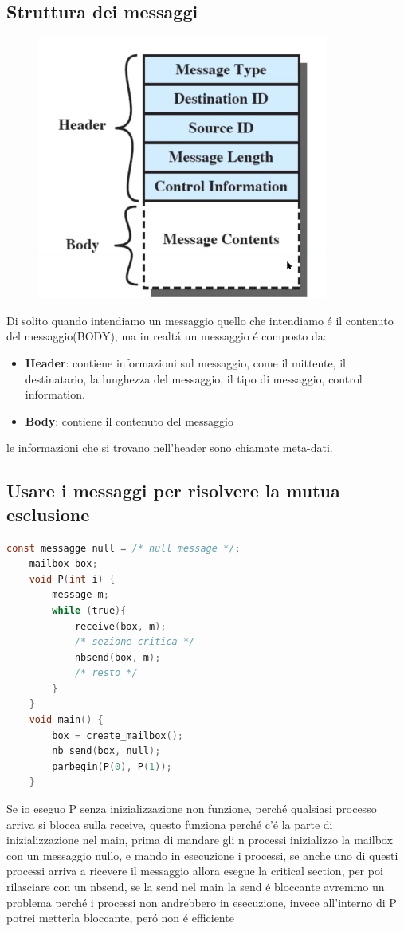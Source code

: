 \subsection{Struttura dei messaggi}
\begin{figure}[H]
    \centering
    \includegraphics[width=0.7\linewidth]{immagini/StrutturaDiUnMessaggio}
\end{figure}
Di solito quando intendiamo un messaggio quello che intendiamo é il contenuto del messaggio(BODY), ma in realtá un messaggio é composto da:
\begin{itemize}
    \item \textbf{Header}: contiene informazioni sul messaggio, come il mittente, il destinatario, la lunghezza del messaggio, il tipo di messaggio, control information.
    \item \textbf{Body}: contiene il contenuto del messaggio
\end{itemize}
le informazioni che si trovano nell'header sono chiamate meta-dati.
\subsection{Usare i messaggi per risolvere la mutua esclusione}
\begin{lstlisting}[language=C]
    const messagge null = /* null message */;
    mailbox box;
    void P(int i) {
        message m;
        while (true){
            receive(box, m);
            /* sezione critica */
            nbsend(box, m);
            /* resto */
        }
    }
    void main() {
        box = create_mailbox();
        nb_send(box, null);
        parbegin(P(0), P(1));
    }
\end{lstlisting}
Se io eseguo P senza inizializzazione non funzione, perché qualsiasi processo arriva si blocca sulla receive, questo
funziona perché c'é la parte di inizializzazione nel main, prima di mandare gli n processi inizializzo la mailbox con un messaggio nullo,
e mando in esecuzione i processi, se anche uno di questi processi arriva a ricevere il messaggio allora esegue la critical section, per poi
rilasciare con un nbsend, se la send nel main la send é bloccante avremmo un problema perché i processi non andrebbero in esecuzione, invece
all'interno di P potrei metterla bloccante, peró non é efficiente
